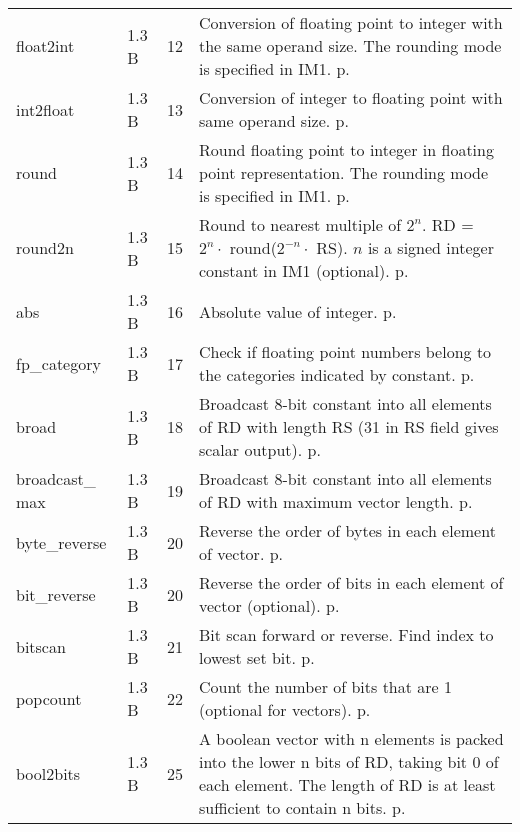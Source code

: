 \documentclass[forwardcom.tex]{subfiles}
\begin{document}
\begin{longtable} {|p{25mm}|p{14mm}|p{10mm}|p{95mm}|}
float2int     & 1.3 B & 12 & Conversion of floating point to integer with the same operand size. The rounding mode is specified in IM1. p. \pageref{table:float2intInstruction} \\
int2float     & 1.3 B & 13 & Conversion of integer to floating point with same operand size. p. \pageref{table:int2floatInstruction} \\

round         & 1.3 B & 14 & Round floating point to integer in floating point  representation. The rounding mode is specified in IM1. p. \pageref{table:roundInstruction} \\
round2n       & 1.3 B & 15 & Round to nearest multiple of $2^n$. \newline 
RD = $2^n\cdot$ round($2^{-n}\cdot$ RS). $n$ is a signed integer constant in IM1 (optional). p. \pageref{table:round2nInstruction} \\
abs           & 1.3 B & 16 & Absolute value of integer. p. \pageref{table:absInstruction} \\

fp\_category  & 1.3 B & 17 & Check if floating point numbers belong to the categories indicated by constant. p. \pageref{table:fpCategoryInstruction} \\

broad         & 1.3 B & 18 & Broadcast 8-bit constant into all elements of RD with length RS (31 in RS field gives scalar output). p. \pageref{table:broadInstruction} \\
broadcast\_ max & 1.3 B & 19 & Broadcast 8-bit constant into all elements of RD with maximum vector length. p. \pageref{table:broadcastMaxInstruction} \\

byte\_reverse & 1.3 B & 20 & Reverse the order of bytes in each element of vector. p. \pageref{table:bitReverseInstruction} \\
bit\_reverse  & 1.3 B & 20 & Reverse the order of bits in each element of vector (optional). p. \pageref{table:bitReverseInstruction} \\

bitscan       & 1.3 B & 21 & Bit scan forward or reverse. Find index to lowest set bit. p. \pageref{table:bitscanInstruction} \\

popcount      & 1.3 B & 22 & Count the number of bits that are 1 (optional for vectors). p. \pageref{table:popcountInstruction} \\

bool2bits     & 1.3 B & 25 & A boolean vector with n elements is packed into the lower n bits of RD, taking bit 0 of each element. The length of RD is at least sufficient to contain n bits. p. \pageref{table:bool2bitsInstruction} \\


\end{longtable}
\end{document}
